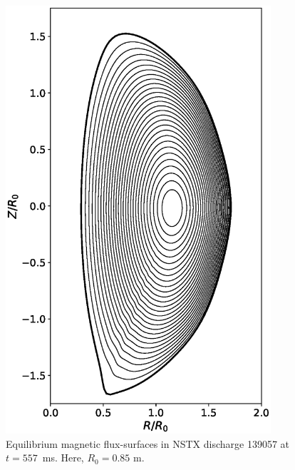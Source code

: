 \documentclass[12pt,prb,aps]{revtex4-1}
\begin{document}
\begin{figure}
\centerline{\includegraphics[height=6.25in]{Fig11.eps}}
\caption{Equilibrium magnetic flux-surfaces in NSTX discharge  139057 at $t=557$\, ms. Here, $R_0=0.85$ m.}\label{fig11}
\end{figure}
\end{document}
